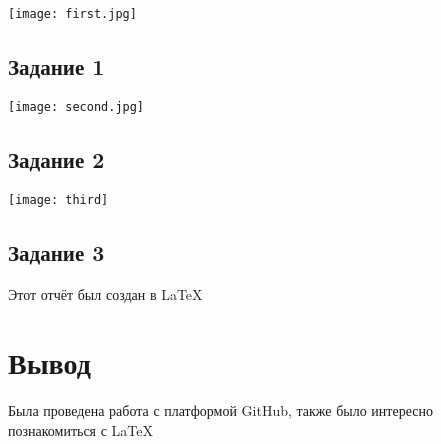 \documentclass[12pt]{article}
\begin{document}
		\texttt{[image: first.jpg]}
		
		\subsection{Задание 1}
		
		\texttt{[image: second.jpg]}
		
		\subsection{Задание 2}
		
		
		\texttt{[image: third]}
		
		\subsection{Задание 3}
		
		Этот отчёт был создан в LaTeX
		
		\section{Вывод}
		
		Была проведена работа с платформой GitHub, также было интересно познакомиться с LaTeX
		
		
	
\end{document}
